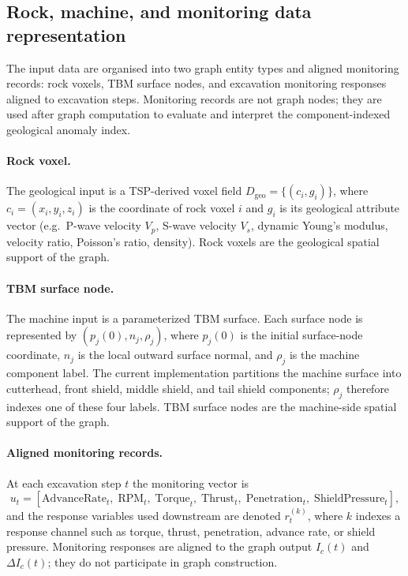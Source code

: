 \subsection{Rock, machine, and monitoring data representation}
\label{sec:definition}
The input data are organised into two graph entity types and aligned
monitoring records: rock voxels, TBM surface nodes, and excavation monitoring
responses aligned to excavation steps. Monitoring records are not graph nodes;
they are used after graph computation to evaluate and interpret the
component-indexed geological anomaly index.

\paragraph{Rock voxel.} The geological input is a TSP-derived voxel field
$D_{\mathrm{geo}}=\{(c_i,g_i)\}$, where $c_i=(x_i,y_i,z_i)$ is the coordinate
of rock voxel $i$ and $g_i$ is its geological attribute vector (e.g.\
P-wave velocity $V_p$, S-wave velocity $V_s$, dynamic Young's modulus, velocity
ratio, Poisson's ratio, density). Rock voxels are the geological spatial
support of the graph.

\paragraph{TBM surface node.} The machine input is a parameterized TBM
surface. Each surface node is represented by $(p_j(0),n_j,\rho_j)$, where
$p_j(0)$ is the initial surface-node coordinate, $n_j$ is the local outward
surface normal, and $\rho_j$ is the machine component label. The current
implementation partitions the machine surface into cutterhead, front shield,
middle shield, and tail shield components; $\rho_j$ therefore indexes one of
these four labels. TBM surface nodes are the machine-side spatial support of
the graph.

\paragraph{Aligned monitoring records.} At each excavation step $t$ the monitoring
vector is
\[
u_t = [\mathrm{AdvanceRate}_t,\; \mathrm{RPM}_t,\; \mathrm{Torque}_t,\;
\mathrm{Thrust}_t,\; \mathrm{Penetration}_t,\; \mathrm{ShieldPressure}_t],
\]
and the response variables used downstream are denoted $r_t^{(k)}$, where $k$
indexes a response channel such as torque, thrust, penetration, advance rate,
or shield pressure. Monitoring responses are aligned to the graph output
$I_c(t)$ and $\Delta I_c(t)$; they do not participate in graph construction.

